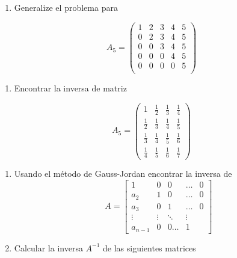\documentclass[
]{article}
\providecommand{\tightlist}{%
  \setlength{\itemsep}{0pt}\setlength{\parskip}{0pt}}
\begin{document}
\begin{enumerate}
\def\labelenumi{\arabic{enumi}.}
\setcounter{enumi}{1}
\tightlist
\item
  Generalize el problema para
\end{enumerate}

\begin{equation}
  A_5 = \begin{pmatrix}
          1 & 2 & 3 & 4 & 5 \\
          0 & 2 & 3 & 4 & 5 \\
          0 & 0 & 3 & 4 & 5 \\
          0 & 0 & 0 & 4 & 5 \\
          0 & 0 & 0 & 0 & 5 \\
        \end{pmatrix}
\end{equation}

\begin{enumerate}
\def\labelenumi{\arabic{enumi}.}
\setcounter{enumi}{2}
\tightlist
\item
  Encontrar la inversa de matriz
\end{enumerate}

\begin{equation}
  A_5 = \begin{pmatrix}
          1           & \frac{1}{2} & \frac{1}{3} & \frac{1}{4} \\
          \frac{1}{2} & \frac{1}{3} & \frac{1}{4} & \frac{1}{5} \\
          \frac{1}{3} & \frac{1}{4} & \frac{1}{5} & \frac{1}{6} \\
          \frac{1}{4} & \frac{1}{5} & \frac{1}{6} & \frac{1}{7}
        \end{pmatrix}
\end{equation}

\begin{enumerate}
\def\labelenumi{\arabic{enumi}.}
\setcounter{enumi}{3}
\item
  Usando el método de Gauss-Jordan encontrar la inversa de
  \begin{equation}
    A= \begin{bmatrix} 
     1    & 0 & 0 & \ldots & 0 \\
     a_2  & 1 & 0 & \ldots & 0 \\
     a_3  & 0 & 1 & \ldots & 0 \\
   \vdots & \vdots & \ddots & \vdots \\
     a_{n-1} & 0 & 0 \ldots & 1
    \end{bmatrix}
  \end{equation}
\item
  Calcular la inversa \(A^{-1}\) de las siguientes matrices
\end{enumerate}
\end{document}
